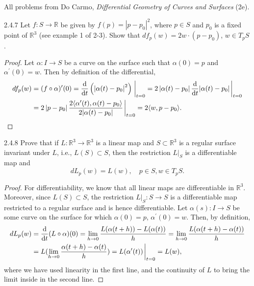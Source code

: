 \documentclass[11pt]{article}
\begin{document}
All problems from Do Carmo, \textit{Differential Geometry of Curves and Surfaces} (2e).

\begin{problem}{2.4.7}
	Let \( f: S \rightarrow \mathbb{R} \) be given by \( f(p)= |p-p_0|^2 \), where \( p \in S \) and \( p_0 \) is a fixed point of \( \mathbb{R}^3 \) (see example 1 of 2-3).
	Show that \( d f_p(w) = 2w \cdot (p-p_0) \), \( w \in T_pS \).
\end{problem}
\begin{proof}
	Let \(\alpha: I \rightarrow S\) be a curve on the surface such that \(\alpha(0)=p\) and \(\alpha^{\prime}(0)=w\).
	Then by definition of the differential,
	\begin{equation}
		\label{eq:5}
		\begin{aligned}
			df_p(w) & = (f \circ \alpha)^{\prime}(0) = \frac{\mathrm{d} }{\mathrm{d} t}\left( \left| \alpha(t) - p_0 \right|^2 \right) \eval_{t=0} = 2 \left| \alpha(t) - p_0 \right| \frac{\mathrm{d} }{\mathrm{d} t}|\alpha(t)-p_0| \eval_{t=0} \\
			        & = 2 \left| p-p_0 \right| \frac{2 \langle \alpha^{\prime}(t), \alpha(t) - p_{0} \rangle}{2 |\alpha(t) - p_{0}|} \eval_{t=0} = 2 \langle w, p - p_{0} \rangle.
		\end{aligned}
	\end{equation}
\end{proof}

\begin{problem}{2.4.8}
	Prove that if \( L: \mathbb{R}^3 \rightarrow \mathbb{R}^3 \) is a linear map and \( S \subset \mathbb{R}^3 \) is a regular surface invariant under \( L \), i.e., \( L(S) \subset S \), then the restriction \( L|_S \) is a differentiable map and
	\begin{equation}
		\label{eq:1}
		dL_p(w) = L(w), \quad p \in S, w \in T_pS.
	\end{equation}
\end{problem}
\begin{proof}
  For differentiability, we know that all linear maps are differentiable in \( \mathbb{R}^3 \).
  Moreover, since \( L(S) \subset S \), the restriction \( L|_S : S \rightarrow S \) is a differentiable map restricted to a regular surface and is hence differentiable.
  Let \( \alpha(s): I \rightarrow S \) be some curve on the surface for which \( \alpha(0) = p \), \(\alpha^{\prime}(0)= w\).
  Then, by definition,
  \begin{equation}
  \label{eq:19}
  \begin{aligned}
    dL_p(w) &= \frac{\mathrm{d} }{\mathrm{d} t}(L \circ \alpha)(0) = \lim_{h \rightarrow 0}\frac{L(\alpha(t + h)) - L(\alpha(t))}{h} = \lim_{h\rightarrow0} \frac{L(\alpha(t+h) - \alpha(t))}{h} \\
    &= L(\lim_{h\rightarrow0} \frac{\alpha(t+h) - \alpha(t)}{h}) = L(\alpha^{\prime}(t))\eval_{t=0} = L(w),
  \end{aligned}
\end{equation}
where we have used linearity in the first line, and the continuity of \( L \) to bring the limit inside in the second line.
\end{proof}
\end{document}
